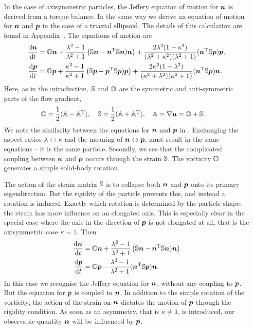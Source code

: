 \documentclass[thesis.tex]{subfiles}
\begin{document}
In the case of axisymmetric particles, the Jeffery equation of motion for $\mbox{\boldmath$n$}$ is derived from a torque balance. In the same way we derive an equation of motion for $\mbox{\boldmath$n$}$ and $\mbox{\boldmath$p$}$ in the case of a triaxial ellipsoid. The details of this calculation are found in Appendix~. The equations of motion are
\begin{align}
	\diff{\ve{n}}{t} &= \ma O \ve{n} + \frac{\lambda^2-1}{\lambda^2+1} \left(\ma S \ve n- \ve{n}\transpose \ma S \ve{n})\ve{n}\right) + \frac{ 2\lambda^2 (1 - \kappa^2) }{(\lambda^2+\kappa^2)(\lambda^2+1)}(\ve{n}\transpose \ma S \ve{p})\ve{p}, \nn\\
	\diff{\ve{p}}{t} &= \ma O \ve{p} + \frac{\kappa^2-1}{\kappa^2+1}\left(\ma S \ve p - \ve{p}\transpose \ma S \ve{p})\ve{p}\right) + \frac{ 2\kappa^2 (1 - \lambda^2) }{(\kappa^2+\lambda^2)(\kappa^2+1)}(\ve{n}\transpose \ma S \ve{p})\ve{n}.\eqnlab{triaxial_equation}
\end{align}
Here, as in the introduction, $\mathbb{S}$ and $\mathbb{O}$ are the symmetric and anti-symmetric parts of the flow gradient,
\begin{align*}
	&\mathbb{O} = \frac{1}{2}(\mathbb{A} - \mathbb{A}^{\mathrm T}),\quad
	\mathbb{S} = \frac{1}{2}(\mathbb{A} + \mathbb{A}^{\mathrm T}),\quad
	\mathbb{A} = \nabla \mbox{\boldmath$u$} = \mathbb{O} + \mathbb{S}.
\end{align*}
We note the similarity between the equations for $\mbox{\boldmath$n$}$ and $\mbox{\boldmath$p$}$ in . Exchanging the aspect ratios $\lambda \leftrightarrow \kappa$ and the meaning of $\mbox{\boldmath$n$} \leftrightarrow \mbox{\boldmath$p$}$, must result in the same equations -- it is the same particle. Secondly, we see that the complicated coupling between $\mbox{\boldmath$n$}$ and $\mbox{\boldmath$p$}$ occurs through the strain $\mathbb{S}$. The vorticity $\mathbb{O}$ generates a simple solid-body rotation.

The action of the strain matrix $\mathbb{S}$ is to collapse both $\mbox{\boldmath$n$}$ and $\mbox{\boldmath$p$}$ onto its primary eigendirection. But the rigidity of the particle prevents this, and instead a rotation is induced. Exactly which rotation is determined by the particle shape: the strain has more influence on an elongated axis. This is especially clear in the special case where the axis in the direction of $\mbox{\boldmath$p$}$ is not elongated at all, that is the axisymmetric case $\kappa = 1$. Then
\begin{align}
	\diff{\ve{n}}{t} &= \ma O \ve{n} + \frac{\lambda^2-1}{\lambda^2+1} \left(\ma S \ve n- \ve{n}\transpose \ma S \ve{n})\ve{n}\right) \nn\\
	\diff{\ve{p}}{t} &= \ma O \ve{p} - \frac{   \lambda^2-1 }{\lambda^2+1}(\ve{n}\transpose \ma S \ve{p})\ve{n}.\eqnlab{triaxial_equation_symm}
\end{align}
In this case we recognise the Jeffery equation for $\mbox{\boldmath$n$}$, without any coupling to $\mbox{\boldmath$p$}$. But the equation for $\mbox{\boldmath$p$}$ is coupled to $\mbox{\boldmath$n$}$.  In addition to the simple rotation of the vorticity, the action of the strain on $\mbox{\boldmath$n$}$ dictates the motion of $\mbox{\boldmath$p$}$ through the rigidity condition. As soon as an asymmetry, that is $\kappa \neq 1$, is introduced, our observable quantity $\mbox{\boldmath$n$}$ will be influenced by $\mbox{\boldmath$p$}$.
\end{document}
